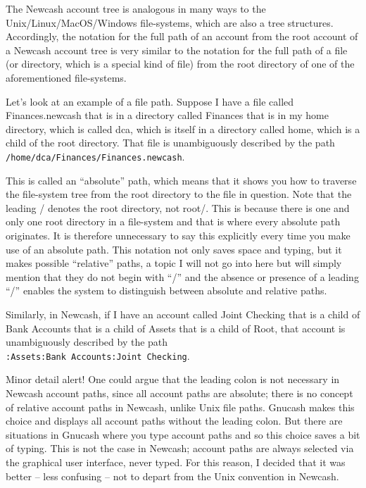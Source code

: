 \documentclass{report}
\begin{document}
The Newcash account tree is analogous in many ways to the Unix/\linebreak[0]Linux/\linebreak[0]MacOS/\linebreak[0]Windows file-systems, which are also a tree structures. Accordingly, the notation for the full path of an account from the root account of a Newcash account tree is very similar to the notation for the full path of a file (or directory, which is a special kind of file) from the root directory of one of the aforementioned file-systems.

Let's look at an example of a file path. Suppose I have a file called Finances.newcash that is in a directory called Finances that is in my home directory, which is called dca, which is itself in a directory called home, which is a child of the root directory. That file is unambiguously described by the path \verb|/home/dca/Finances/Finances.newcash|.

This is called an ``absolute'' path, which means that it shows you how to traverse the file-system tree from the root directory to the file in question. Note that the leading / denotes the root directory, not root/. This is because there is one and only one root directory in a file-system and that is where every absolute path originates. It is therefore unnecessary to say this explicitly every time you make use of an absolute path. This notation not only saves space and typing, but it makes possible ``relative'' paths, a topic I will not go into here but will simply mention that they do not begin with ``/'' and the absence or presence of a leading ``/'' enables the system to distinguish between absolute and relative paths.

Similarly, in Newcash, if I have an account called Joint Checking that is a child of Bank Accounts that is a child of Assets that is a child of Root, that account is unambiguously described by the path
\\\verb|:Assets:Bank Accounts:Joint Checking|.

Minor detail alert! One could argue that the leading colon is not necessary in Newcash account paths, since all account paths are absolute; there is no concept of relative account paths in Newcash, unlike Unix file paths. Gnucash makes this choice and displays all account paths without the leading colon. But there are situations in Gnucash where you type account paths and so this choice saves a bit of typing. This is not the case in Newcash; account paths are always selected via the graphical user interface, never typed. For this reason, I decided that it was better -- less confusing -- not to depart from the Unix convention in Newcash.
\end{document}
